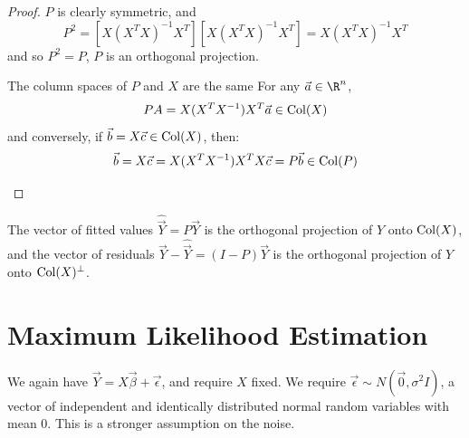 \documentclass[../Main.tex]{subfiles}
\begin{document}
\begin{proof}
    $P$ is clearly symmetric, and
    \begin{equation*}
        P^2 = \left[X(X^T X)^{-1} X^T\right]\left[X (X^T X)^{-1} X^T\right] = X(X^T X)^{-1} X^T
    \end{equation*}
    and so $P^2 = P$, $P$ is an orthogonal projection.

    \begin{subproof}{The column spaces of $P$ and $X$ are the same}
        For any $\vec{a} \in \R^n$,
        \begin{equation*}
            PA = X(X^TX^{-1})X^T \vec{a} \in \operatorname{Col}(X)
        \end{equation*}
        and conversely, if $\vec{b} = X\vec{c} \in \operatorname{Col}(X)$, then:
        \begin{equation*}
            \vec{b} = X\vec{c} = X(X^TX^{-1})X^T X \vec{c} = P\vec{b} \in \operatorname{Col}(P)
        \end{equation*}
    \end{subproof}
\end{proof}
\begin{corollary}
    The vector of fitted values $\hat{\vec{Y}} = P\vec{Y}$ is the orthogonal projection of $Y$ onto $\operatorname{Col}(X)$, and the vector of residuals $\vec{Y} - \hat{\vec{Y}} = (I-P)\vec{Y}$ is the orthogonal projection of $Y$ onto $\operatorname{Col}(X)^\perp$.
    \label{corResidualsProjection}
\end{corollary}
\section{Maximum Likelihood Estimation}
We again have $\vec{Y} = X\vec{\beta} + \vec{\epsilon}$, and require $X$ fixed. We require $\vec{\epsilon} \sim N(\vec0, \sigma^2 I)$, a vector of independent and identically distributed normal random variables with mean $0$. This is a stronger assumption on the noise.
\end{document}
